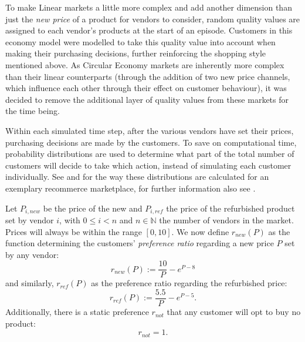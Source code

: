 To make Linear markets a little more complex and add another dimension than just the \emph{new price} of a product for vendors to consider, random quality values are assigned to each vendor's products at the start of an episode. Customers in this economy model were modelled to take this quality value into account when making their purchasing decisions, further reinforcing the shopping style mentioned above. As Circular Economy markets are inherently more complex than their linear counterparts (through the addition of two new price channels, which influence each other through their effect on customer behaviour), it was decided to remove the additional layer of quality values from these markets for the time being.

Within each simulated time step, after the various vendors have set their prices, purchasing decisions are made by the customers. To save on computational time, probability distributions are used to determine what part of the total number of customers will decide to take which action, instead of simulating each customer individually. See  and  for the way these distributions are calculated for an exemplary recommerce marketplace, for further information also see \cite{NickThesis}.

\clearpage
\begin{definition}\label{def:customerDecisions}
	Let \(P_{i, new}\) be the price of the new and \(P_{i, ref}\) the price of the refurbished product set by vendor \(i\), with \(0 \leq i < n\) and \(n \in \mathbb{N}\) the number of vendors in the market. Prices will always be within the range \([0,10]\). We now define \(r_{new}(P)\) as the function determining the customers' \emph{preference ratio} regarding a new price \(P\) set by any vendor:
	\begin{equation}\label{eq:NewPref}
		r_{new}(P) := \frac{10}{P} - e^{P - 8}
	\end{equation}
	and similarly, \(r_{ref}(P)\) as the preference ratio regarding the refurbished price:
	\begin{equation}\label{eq:RefPref}
		r_{ref}(P) := \frac{5.5}{P} - e^{P - 5}.
	\end{equation}
	Additionally, there is a static preference \(r_{not}\) that any customer will opt to buy no product:
	\begin{equation}\label{eq:NothingPref}
		r_{not} = 1.
	\end{equation}
\end{definition}


